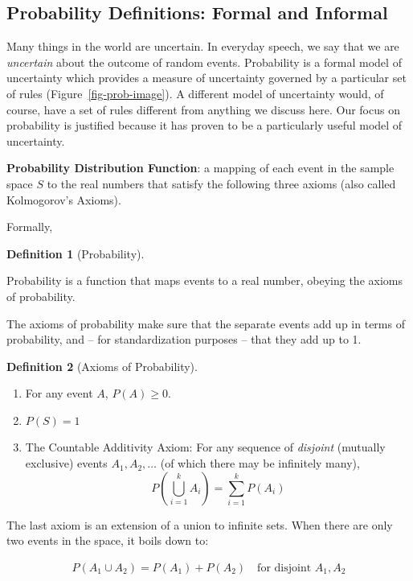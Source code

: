 \documentclass[
  letterpaper,
]{book}
\providecommand{\tightlist}{%
  \setlength{\itemsep}{0pt}\setlength{\parskip}{0pt}}\usepackage{longtable,booktabs,array}
\theoremstyle{definition}
\newtheorem{definition}{Definition}[chapter]
\theoremstyle{definition}
\theoremstyle{plain}
\theoremstyle{definition}
\theoremstyle{plain}
\theoremstyle{plain}
\theoremstyle{remark}
\begin{document}
\hypertarget{probability-definitions-formal-and-informal}{%
\subsection*{Probability Definitions: Formal and
Informal}\label{probability-definitions-formal-and-informal}}

Many things in the world are uncertain. In everyday speech, we say that
we are \emph{uncertain} about the outcome of random events. Probability
is a formal model of uncertainty which provides a measure of uncertainty
governed by a particular set of rules (Figure~\ref{fig-prob-image}). A
different model of uncertainty would, of course, have a set of rules
different from anything we discuss here. Our focus on probability is
justified because it has proven to be a particularly useful model of
uncertainty.

\textbf{Probability Distribution Function}: a mapping of each event in
the sample space \(S\) to the real numbers that satisfy the following
three axioms (also called Kolmogorov's Axioms).

Formally,

\leavevmode{}%
\begin{definition}[Probability]\label{def-prob}

Probability is a function that maps events to a real number, obeying the
axioms of probability.

\end{definition}

The axioms of probability make sure that the separate events add up in
terms of probability, and -- for standardization purposes -- that they
add up to 1.

\leavevmode{}%
\begin{definition}[Axioms of Probability]\label{def-}

\begin{enumerate}
\def\labelenumi{\arabic{enumi}.}
\tightlist
\item
  For any event \(A\), \(P(A)\ge 0\).
\item
  \(P(S)=1\)
\item
  The Countable Additivity Axiom: For any sequence of \emph{disjoint}
  (mutually exclusive) events \(A_1,A_2,\ldots\) (of which there may be
  infinitely many), \[P\left( \bigcup\limits_{i=1}^k
  A_i\right)=\sum\limits_{i=1}^k P(A_i)\]
\end{enumerate}

The last axiom is an extension of a union to infinite sets. When there
are only two events in the space, it boils down to:

\begin{align*}
P(A_1 \cup A_2) = P(A_1) + P(A_2) \quad\text{for disjoint } A_1, A_2
\end{align*}

\end{definition}
\end{document}

